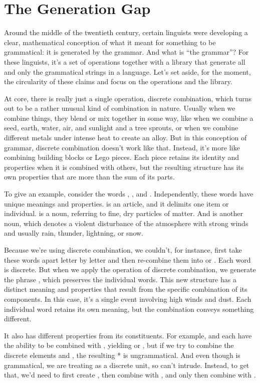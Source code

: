 \chapter{The Generation Gap} \label{ch:generation-gap}
Around the middle of the twentieth century, certain linguists were developing a clear, mathematical conception of what it meant for something to be grammatical: it is generated by the grammar. And what is ``the grammar''? For these linguists, it's a set of operations together with a library that generate all and only the grammatical strings in a language. Let's set aside, for the moment, the circularity of these claims and focus on the operations and the library.

At core, there is really just a single operation, discrete combination, which turns out to be a rather unusual kind of combination in nature. Usually when we combine things, they blend or mix together in some way, like when we combine a seed, earth, water, air, and sunlight and a tree sprouts, or when we combine different metals under intense heat to create an alloy. But in this conception of grammar, discrete combination doesn't work like that. Instead, it's more like combining building blocks or Lego pieces. Each piece retains its identity and properties when it is combined with others, but the resulting structure has its own properties that are more than the sum of its parts.

To give an example, consider the words , , and . Independently, these words have unique meanings and properties.  is an article, and it delimits one item or individual.  is a noun, referring to fine, dry particles of matter. And  is another noun, which denotes a violent disturbance of the atmosphere with strong winds and usually rain, thunder, lightning, or snow.

Because we're using discrete combination, we couldn't, for instance, first take these words apart letter by letter and then re-combine them into  or . Each word is discrete. But when we apply the operation of discrete combination, we generate the phrase , which preserves the individual words. This new structure has a distinct meaning and properties that result from the specific combination of its components. In this case, it's a single event involving high winds and dust. Each individual word retains its own meaning, but the combination conveys something different.

It also has different properties from its constituents. For example,  and  each have the ability to be combined with , yielding  or , but if we try to combine the discrete elements  and , the resulting * is ungrammatical. And even though  is grammatical, we are treating  as a discrete unit, so  can't intrude. Instead, to get that, we'd need to first create , then combine with , and only then combine with . 

